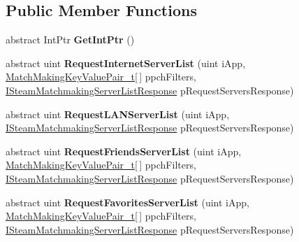 \subsection*{Public Member Functions}
\begin{DoxyCompactItemize}
\item 
\hypertarget{classValve_1_1Steamworks_1_1ISteamMatchmakingServers_a2f5de65cbe2bf5b8c505a4028e4d434c}{}abstract Int\+Ptr {\bfseries Get\+Int\+Ptr} ()\label{classValve_1_1Steamworks_1_1ISteamMatchmakingServers_a2f5de65cbe2bf5b8c505a4028e4d434c}

\item 
\hypertarget{classValve_1_1Steamworks_1_1ISteamMatchmakingServers_a05a57e55c4fecb99fec9f9bb62f85bb5}{}abstract uint {\bfseries Request\+Internet\+Server\+List} (uint i\+App, \hyperlink{structValve_1_1Steamworks_1_1MatchMakingKeyValuePair__t}{Match\+Making\+Key\+Value\+Pair\+\_\+t}\mbox{[}$\,$\mbox{]} ppch\+Filters, \hyperlink{classValve_1_1Steamworks_1_1ISteamMatchmakingServerListResponse}{I\+Steam\+Matchmaking\+Server\+List\+Response} p\+Request\+Servers\+Response)\label{classValve_1_1Steamworks_1_1ISteamMatchmakingServers_a05a57e55c4fecb99fec9f9bb62f85bb5}

\item 
\hypertarget{classValve_1_1Steamworks_1_1ISteamMatchmakingServers_a498b47951bb43593c6990f54f7f48d7d}{}abstract uint {\bfseries Request\+L\+A\+N\+Server\+List} (uint i\+App, \hyperlink{classValve_1_1Steamworks_1_1ISteamMatchmakingServerListResponse}{I\+Steam\+Matchmaking\+Server\+List\+Response} p\+Request\+Servers\+Response)\label{classValve_1_1Steamworks_1_1ISteamMatchmakingServers_a498b47951bb43593c6990f54f7f48d7d}

\item 
\hypertarget{classValve_1_1Steamworks_1_1ISteamMatchmakingServers_a1d625fb7d36b7f606919647bb2ce87d3}{}abstract uint {\bfseries Request\+Friends\+Server\+List} (uint i\+App, \hyperlink{structValve_1_1Steamworks_1_1MatchMakingKeyValuePair__t}{Match\+Making\+Key\+Value\+Pair\+\_\+t}\mbox{[}$\,$\mbox{]} ppch\+Filters, \hyperlink{classValve_1_1Steamworks_1_1ISteamMatchmakingServerListResponse}{I\+Steam\+Matchmaking\+Server\+List\+Response} p\+Request\+Servers\+Response)\label{classValve_1_1Steamworks_1_1ISteamMatchmakingServers_a1d625fb7d36b7f606919647bb2ce87d3}

\item 
\hypertarget{classValve_1_1Steamworks_1_1ISteamMatchmakingServers_ad660d3a21df7bf1800eb0d67ac3430aa}{}abstract uint {\bfseries Request\+Favorites\+Server\+List} (uint i\+App, \hyperlink{structValve_1_1Steamworks_1_1MatchMakingKeyValuePair__t}{Match\+Making\+Key\+Value\+Pair\+\_\+t}\mbox{[}$\,$\mbox{]} ppch\+Filters, \hyperlink{classValve_1_1Steamworks_1_1ISteamMatchmakingServerListResponse}{I\+Steam\+Matchmaking\+Server\+List\+Response} p\+Request\+Servers\+Response)\label{classValve_1_1Steamworks_1_1ISteamMatchmakingServers_ad660d3a21df7bf1800eb0d67ac3430aa}


\end{DoxyCompactItemize}
